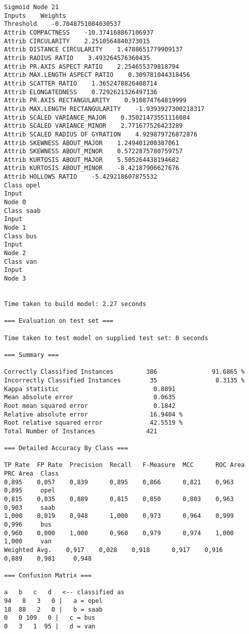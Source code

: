 \documentclass[
	article,			%
	11pt,				%
	oneside,			%
	a4paper,			%
	english,			%
	brazil,				%
	sumario=tradicional
	]{abntex2}
\begin{document}
\begin{lstlisting}
Sigmoid Node 21
Inputs    Weights
Threshold    -0.7048751084030537
Attrib COMPACTNESS    -10.374168867106937
Attrib CIRCULARITY    2.2510564840373015
Attrib DISTANCE CIRCULARITY    1.4788651779909137
Attrib RADIUS RATIO    3.493264576360435
Attrib PR.AXIS ASPECT RATIO    2.254655379818794
Attrib MAX.LENGTH ASPECT RATIO    0.309781044318456
Attrib SCATTER RATIO    1.3652478826408714
Attrib ELONGATEDNESS    0.7292621326497136
Attrib PR.AXIS RECTANGULARITY    0.910874764819999
Attrib MAX.LENGTH RECTANGULARITY    -1.9393927300218317
Attrib SCALED VARIANCE_MAJOR    0.35021473551116084
Attrib SCALED VARIANCE_MINOR    2.771677526423289
Attrib SCALED RADIUS OF GYRATION    4.929879726872876
Attrib SKEWNESS ABOUT_MAJOR    1.249401200387061
Attrib SKEWNESS ABOUT_MINOR    0.5722875780759757
Attrib KURTOSIS ABOUT_MAJOR    5.505264438194682
Attrib KURTOSIS ABOUT_MINOR    -8.42187906627676
Attrib HOLLOWS RATIO    -5.429218607875532
Class opel
Input
Node 0
Class saab
Input
Node 1
Class bus
Input
Node 2
Class van
Input
Node 3


Time taken to build model: 2.27 seconds

=== Evaluation on test set ===

Time taken to test model on supplied test set: 0 seconds

=== Summary ===

Correctly Classified Instances         386               91.6865 %
Incorrectly Classified Instances        35                8.3135 %
Kappa statistic                          0.8891
Mean absolute error                      0.0635
Root mean squared error                  0.1842
Relative absolute error                 16.9404 %
Root relative squared error             42.5519 %
Total Number of Instances              421     

=== Detailed Accuracy By Class ===

TP Rate  FP Rate  Precision  Recall   F-Measure  MCC      ROC Area  PRC Area  Class
0,895    0,057    0,839      0,895    0,866      0,821    0,963     0,895     opel
0,815    0,035    0,889      0,815    0,850      0,803    0,963     0,903     saab
1,000    0,019    0,948      1,000    0,973      0,964    0,999     0,996     bus
0,960    0,000    1,000      0,960    0,979      0,974    1,000     1,000     van
Weighted Avg.    0,917    0,028    0,918      0,917    0,916      0,889    0,981     0,948     

=== Confusion Matrix ===

a   b   c   d   <-- classified as
94   8   3   0 |   a = opel
18  88   2   0 |   b = saab
0   0 109   0 |   c = bus
0   3   1  95 |   d = van


\end{lstlisting}
\end{document}
